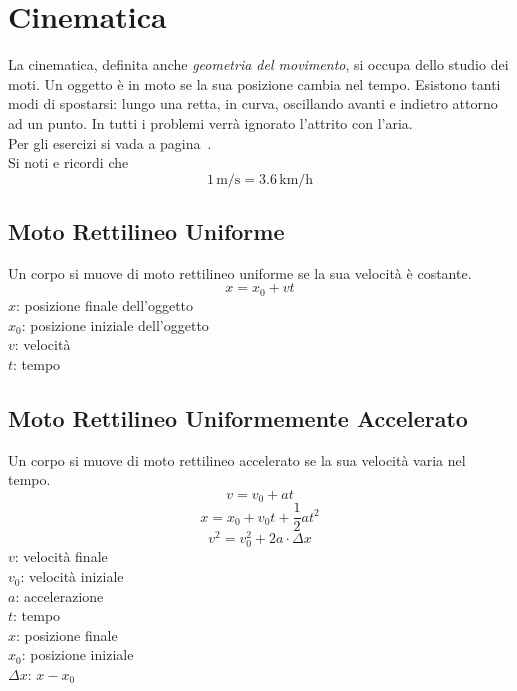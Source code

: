 
\section{Cinematica}\label{sec:cinematica}
La cinematica, definita anche \emph{geometria del movimento}, si occupa dello studio dei moti. Un 
oggetto è in moto se la sua posizione cambia nel tempo. Esistono tanti modi di spostarsi: lungo una
retta, in curva, oscillando avanti e indietro attorno ad un punto. In tutti i problemi verrà 
ignorato l'attrito con l'aria.\\
Per gli esercizi si vada a pagina~\pageref{ex:cinematica}.\\[\baselineskip]
Si noti e ricordi che
\begin{equation*}
1\,\text{m/s} = 3.6\,\text{km/h}
\end{equation*}

\subsection{Moto Rettilineo Uniforme}\label{subsec:cinematica:mru}
Un corpo si muove di moto rettilineo uniforme se la sua velocità è costante.
\begin{equation*}
x = x_0 + vt
\end{equation*}
$x$: posizione finale dell'oggetto\\
$x_0$: posizione iniziale dell'oggetto\\
$v$: velocità\\
$t$: tempo

\subsection{Moto Rettilineo Uniformemente Accelerato}
Un corpo si muove di moto rettilineo accelerato se la sua velocità varia nel tempo.
\begin{equation*}
v = v_0 + at
\end{equation*}
\begin{equation*}
x = x_0 + v_0t + \frac{1}{2}at^2
\end{equation*}
\begin{equation*}
v^2 = v_0^2 + 2a\cdot\Delta x
\end{equation*}
$v$: velocità finale\\
$v_0$: velocità iniziale\\
$a$: accelerazione\\
$t$: tempo\\
$x$: posizione finale\\
$x_0$: posizione iniziale\\
$\Delta x$: $x - x_0$
